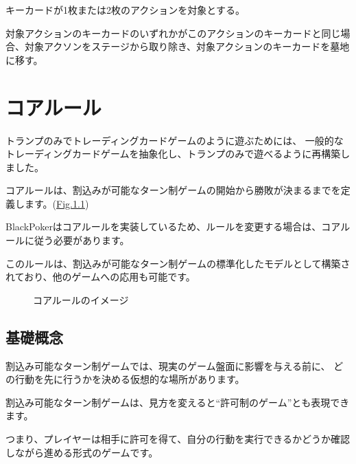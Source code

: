 \documentclass[letterpaper,10pt,dvipdfmx]{sphinxmanual}
\begin{document}
\sphinxAtStartPar
{}

\sphinxAtStartPar
キーカードが1枚または2枚のアクションを対象とする。

\sphinxAtStartPar
{}

\sphinxAtStartPar
対象アクションのキーカードのいずれかがこのアクションのキーカードと同じ場合、対象アクソンをステージから取り除き、対象アクションのキーカードを墓地に移す。

\sphinxstepscope


\chapter{コアルール}
\label{\detokenize{core/core:core-rst}}\label{\detokenize{core/core:id1}}\label{\detokenize{core/core::doc}}
\sphinxAtStartPar
トランプのみでトレーディングカードゲームのように遊ぶためには、
一般的なトレーディングカードゲームを抽象化し、トランプのみで遊べるように再構築しました。

\sphinxAtStartPar
コアルールは、割込みが可能なターン制ゲームの開始から勝敗が決まるまでを定義します。(\hyperref[\detokenize{core/core:abstract-core-rule}]{Fig.\@ \ref{\detokenize{core/core:abstract-core-rule}}})

\sphinxAtStartPar
BlackPokerはコアルールを実装しているため、ルールを変更する場合は、コアルールに従う必要があります。

\sphinxAtStartPar
このルールは、割込みが可能なターン制ゲームの標準化したモデルとして構築されており、他のゲームへの応用も可能です。

\begin{figure}[htbp]
\centering
\capstart

\noindent{}
\caption{コアルールのイメージ}\label{\detokenize{core/core:id33}}\label{\detokenize{core/core:abstract-core-rule}}\end{figure}


\section{基礎概念}
\label{\detokenize{core/core:id2}}
\sphinxAtStartPar
割込み可能なターン制ゲームでは、現実のゲーム盤面に影響を与える前に、
どの行動を先に行うかを決める仮想的な場所があります。

\sphinxAtStartPar
割込み可能なターン制ゲームは、見方を変えると“許可制のゲーム”とも表現できます。

\sphinxAtStartPar
つまり、プレイヤーは相手に許可を得て、自分の行動を実行できるかどうか確認しながら進める形式のゲームです。
\end{document}
